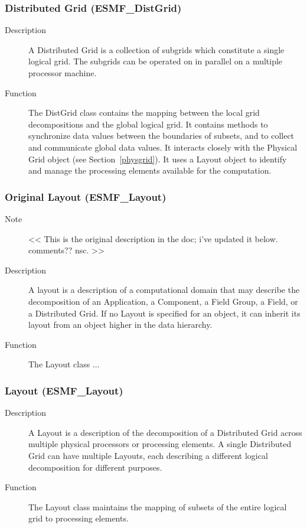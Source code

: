 \subsubsection{Distributed Grid (ESMF\_DistGrid)} 
\label{sec:distgrid} 
\begin{description}
\item [Description] A Distributed Grid is a collection of subgrids which
constitute a single logical grid.  The subgrids can be operated on in
parallel on a multiple processor machine.  
\item [Function] The DistGrid class contains the mapping
between the local grid decompositions and the global logical grid. 
It contains methods to 
synchronize data values between the boundaries of subsets, and to
collect and communicate global data values.  It interacts closely with
the Physical Grid object (see Section~\ref{physgrid}).
It uses a Layout object to identify and manage the processing elements 
available for the computation.
\end{description}

\subsubsection{Original Layout (ESMF\_Layout)}
\label{sec:olayout} 
\begin{description}
\item [Note] << This is the original description in the doc; i've updated
it below.  comments?? nsc. >>
\item [Description] A layout is a description of a computational domain that
may describe the decomposition of an Application, a Component, a Field Group, a Field, or 
a Distributed Grid.
If no Layout is specified for an object, it can inherit its layout from an object
higher in the data hierarchy.  
\item [Function] The Layout class ...
\end{description}

\subsubsection{Layout (ESMF\_Layout)}
\label{sec:layout} 
\begin{description}
\item [Description] A Layout is a description of the decomposition of
a Distributed Grid across multiple physical processors or processing elements.
A single Distributed Grid can have multiple Layouts, each describing a different
logical decomposition for different purposes.
\item [Function] The Layout class maintains the mapping of 
subsets of the entire logical grid to processing elements.
\end{description}

